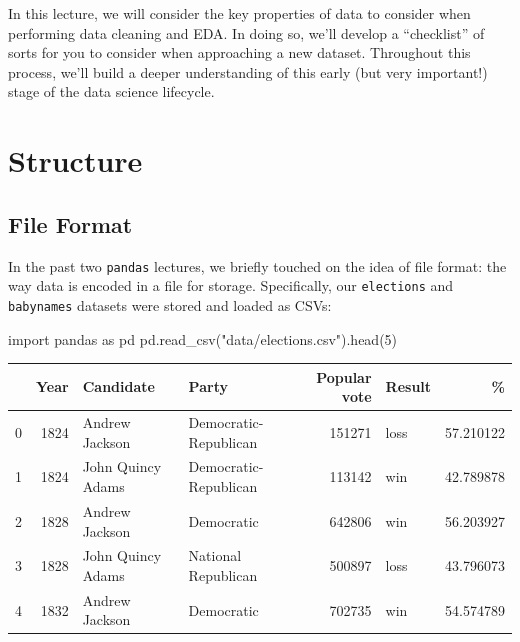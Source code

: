 \documentclass[
  letterpaper,
  DIV=11,
  numbers=noendperiod]{scrreprt}
\newenvironment{Shaded}{\begin{snugshade}}{\end{snugshade}}
\newcommand{\DecValTok}[1]{\textcolor[rgb]{0.68,0.00,0.00}{#1}}
\newcommand{\ImportTok}[1]{\textcolor[rgb]{0.00,0.46,0.62}{#1}}
\newcommand{\NormalTok}[1]{\textcolor[rgb]{0.00,0.23,0.31}{#1}}
\newcommand{\StringTok}[1]{\textcolor[rgb]{0.13,0.47,0.30}{#1}}
\begin{document}
In this lecture, we will consider the key properties of data to consider
when performing data cleaning and EDA. In doing so, we'll develop a
``checklist'' of sorts for you to consider when approaching a new
dataset. Throughout this process, we'll build a deeper understanding of
this early (but very important!) stage of the data science lifecycle.

\hypertarget{structure}{%
\section{Structure}\label{structure}}

\hypertarget{file-format}{%
\subsection{File Format}\label{file-format}}

In the past two \texttt{pandas} lectures, we briefly touched on the idea
of file format: the way data is encoded in a file for storage.
Specifically, our \texttt{elections} and \texttt{babynames} datasets
were stored and loaded as CSVs:

\begin{Shaded}
\begin{Highlighting}[]
\ImportTok{import}\NormalTok{ pandas }\ImportTok{as}\NormalTok{ pd}
\NormalTok{pd.read\_csv(}\StringTok{"data/elections.csv"}\NormalTok{).head(}\DecValTok{5}\NormalTok{)}
\end{Highlighting}
\end{Shaded}

\begin{tabular}{lrllrlr}
\toprule
{} &  Year &          Candidate &                  Party &  Popular vote & Result &          \% \\
\midrule
0 &  1824 &     Andrew Jackson &  Democratic-Republican &        151271 &   loss &  57.210122 \\
1 &  1824 &  John Quincy Adams &  Democratic-Republican &        113142 &    win &  42.789878 \\
2 &  1828 &     Andrew Jackson &             Democratic &        642806 &    win &  56.203927 \\
3 &  1828 &  John Quincy Adams &    National Republican &        500897 &   loss &  43.796073 \\
4 &  1832 &     Andrew Jackson &             Democratic &        702735 &    win &  54.574789 \\
\bottomrule
\end{tabular}
\end{document}
